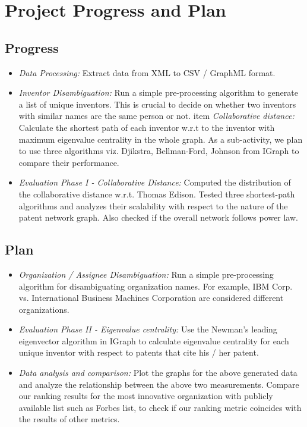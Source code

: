 \section{Project Progress and Plan}


\subsection{Progress}

	\begin{itemize}
		\item {\em Data Processing:} Extract data from XML to CSV / GraphML format.

		\item {\em Inventor Disambiguation:} Run a simple pre-processing algorithm to
		generate a list of unique inventors.  This is crucial to decide on whether
		two inventors with similar names are the same person or not. item {\em
		Collaborative distance:} Calculate the shortest path of each inventor w.r.t
		to the inventor with maximum eigenvalue centrality in the whole graph. As a
		sub-activity, we plan to use three algorithms viz. Djikstra, Bellman-Ford,
		Johnson from IGraph to compare their performance.

		\item {\em Evaluation Phase I - Collaborative Distance:} Computed the
		distribution  of the collaborative distance w.r.t. Thomas Edison. Tested three
		shortest-path algorithms and analyzes their scalability with respect to the
		nature of the patent network graph.  Also checked if the overall network
		follows power law.
	\end{itemize}

\subsection{Plan}

	\begin{itemize}
		\item {\em Organization / Assignee Disambiguation:} Run a simple pre-processing
		algorithm for disambiguating organization names. For example, IBM Corp. vs.
		International Business Machines Corporation are considered different
		organizations.

		\item {\em Evaluation Phase II - Eigenvalue centrality:} Use the Newman's leading eigenvector
		algorithm in IGraph to calculate eigenvalue centrality for each unique
		inventor with respect to patents that cite his / her patent.

		\item {\em Data analysis and comparison:} Plot the graphs for the above
		generated data and analyze the relationship between the above two
		measurements. Compare our ranking results for the most innovative organization with publicly
		available list such as Forbes list, to check if our ranking metric coincides
		with the results of other metrics.
	\end{itemize}


